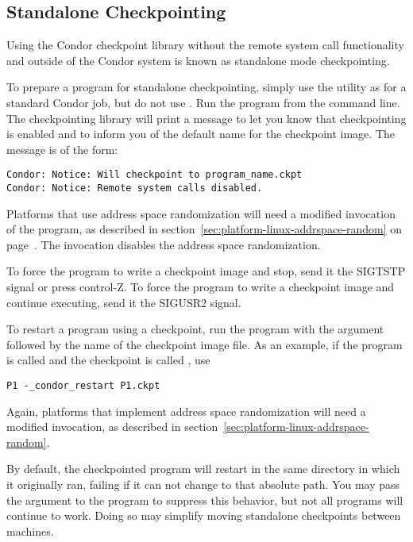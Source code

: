 \subsection{\label{sec:standalone-ckpt}Standalone Checkpointing}

Using the Condor checkpoint library without the remote system call
functionality and outside of the Condor system is known as standalone
mode checkpointing.

To prepare a program for standalone checkpointing, simply use the
 utility as for a standard Condor job, 
but do not use .
Run the program from the command line.
The checkpointing library will print a message to let you know
that checkpointing is enabled and to inform you of the default
name for the checkpoint image.
The message is of the form:

\footnotesize
\begin{verbatim}
Condor: Notice: Will checkpoint to program_name.ckpt
Condor: Notice: Remote system calls disabled.
\end{verbatim}
\normalsize

Platforms that use address space randomization will need
a modified invocation of the program,
as described in section~\ref{sec:platform-linux-addrspace-random} on
page~\pageref{sec:platform-linux-addrspace-random}.
The invocation disables the address space randomization.
 
To force the program to write a checkpoint image and stop, send it
the SIGTSTP signal or press control-Z.  To force the program to 
write a checkpoint image and continue executing, send it the
SIGUSR2 signal.

To restart a program using a checkpoint, run the program
with the argument
 followed by the name of the checkpoint
image file.
As an example, if the program is called  and
the checkpoint is called , use
\begin{verbatim}
P1 -_condor_restart P1.ckpt
\end{verbatim}
Again, platforms that implement address space randomization will
need a modified invocation,
as described in section~\ref{sec:platform-linux-addrspace-random}.

By default, the checkpointed program will restart in the same directory 
in which it originally ran, failing if it can not change to that 
absolute path.  You may pass the  argument 
to the program to suppress this behavior, but not all programs will 
continue to work.  Doing so may simplify moving standalone checkpoints 
between machines.

